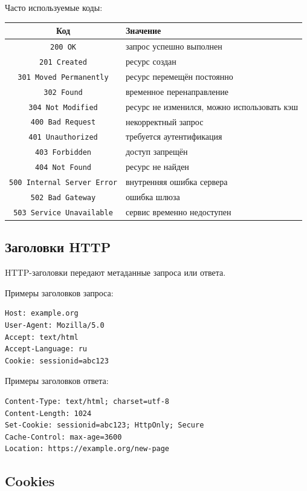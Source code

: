 \documentclass[12pt,a4paper]{article}
\begin{document}
Часто используемые коды:
\begin{center}
\begin{tabular}{|c|p{9cm}|}
\hline
Код & Значение \\
\hline
\texttt{200 OK} & запрос успешно выполнен \\
\hline
\texttt{201 Created} & ресурс создан \\
\hline
\texttt{301 Moved Permanently} & ресурс перемещён постоянно \\
\hline
\texttt{302 Found} & временное перенаправление \\
\hline
\texttt{304 Not Modified} & ресурс не изменился, можно использовать кэш \\
\hline
\texttt{400 Bad Request} & некорректный запрос \\
\hline
\texttt{401 Unauthorized} & требуется аутентификация \\
\hline
\texttt{403 Forbidden} & доступ запрещён \\
\hline
\texttt{404 Not Found} & ресурс не найден \\
\hline
\texttt{500 Internal Server Error} & внутренняя ошибка сервера \\
\hline
\texttt{502 Bad Gateway} & ошибка шлюза \\
\hline
\texttt{503 Service Unavailable} & сервис временно недоступен \\
\hline
\end{tabular}
\end{center}

\subsection{Заголовки HTTP}

HTTP-заголовки передают метаданные запроса или ответа.

Примеры заголовков запроса:
\begin{lstlisting}
Host: example.org
User-Agent: Mozilla/5.0
Accept: text/html
Accept-Language: ru
Cookie: sessionid=abc123
\end{lstlisting}

Примеры заголовков ответа:
\begin{lstlisting}
Content-Type: text/html; charset=utf-8
Content-Length: 1024
Set-Cookie: sessionid=abc123; HttpOnly; Secure
Cache-Control: max-age=3600
Location: https://example.org/new-page
\end{lstlisting}

\subsection{Cookies}
\end{document}

